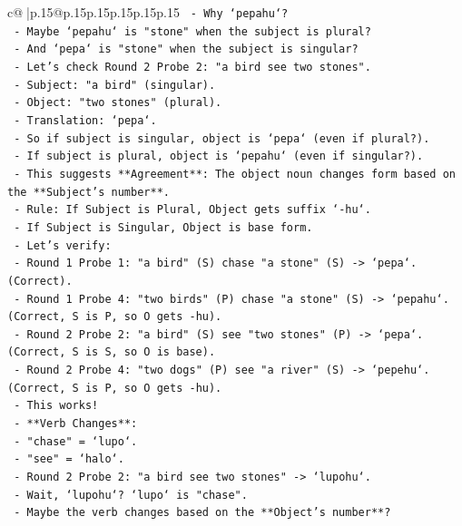 \documentclass{article}
\begin{document}
{\begin{supertabular}{c@{$\;$}|p{.15\linewidth}@{}p{.15\linewidth}p{.15\linewidth}p{.15\linewidth}p{.15\linewidth}p{.15\linewidth}}
{{{\texttt{        {-} Why `pepahu`?} \\
\texttt{        {-} Maybe `pepahu` is "stone" when the subject is plural?} \\
\texttt{        {-} And `pepa` is "stone" when the subject is singular?} \\
\texttt{        {-} Let's check Round 2 Probe 2: "a bird see two stones".} \\
\texttt{        {-} Subject: "a bird" (singular).} \\
\texttt{        {-} Object: "two stones" (plural).} \\
\texttt{        {-} Translation: `pepa`.} \\
\texttt{        {-} So if subject is singular, object is `pepa` (even if plural?).} \\
\texttt{        {-} If subject is plural, object is `pepahu` (even if singular?).} \\
\texttt{        {-} This suggests **Agreement**: The object noun changes form based on the **Subject's number**.} \\
\texttt{        {-} Rule: If Subject is Plural, Object gets suffix `{-}hu`.} \\
\texttt{        {-} If Subject is Singular, Object is base form.} \\
\texttt{        {-} Let's verify:} \\
\texttt{          {-} Round 1 Probe 1: "a bird" (S) chase "a stone" (S) {-}> `pepa`. (Correct).} \\
\texttt{          {-} Round 1 Probe 4: "two birds" (P) chase "a stone" (S) {-}> `pepahu`. (Correct, S is P, so O gets {-}hu).} \\
\texttt{          {-} Round 2 Probe 2: "a bird" (S) see "two stones" (P) {-}> `pepa`. (Correct, S is S, so O is base).} \\
\texttt{          {-} Round 2 Probe 4: "two dogs" (P) see "a river" (S) {-}> `pepehu`. (Correct, S is P, so O gets {-}hu).} \\
\texttt{        {-} This works!} \\
\texttt{      {-} **Verb Changes**:} \\
\texttt{        {-} "chase" = `lupo`.} \\
\texttt{        {-} "see" = `halo`.} \\
\texttt{        {-} Round 2 Probe 2: "a bird see two stones" {-}> `lupohu`.} \\
\texttt{        {-} Wait, `lupohu`? `lupo` is "chase".} \\
\texttt{        {-} Maybe the verb changes based on the **Object's number**?} \\
}}}
\end{supertabular}}
\end{document}

